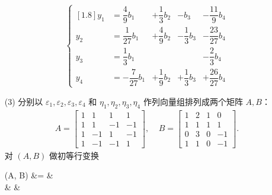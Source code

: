 \documentclass[11pt,a4paper,openany,oneside]{book}
\begin{document}
\begin{enumerate}
 $$ 
\left\{\begin{matrix}[1.8]
y_1 &=  \dfrac{4}{9}b_1 &+ \dfrac{1}{3}b_2 &- b_3               &-\dfrac{11}{9}b_4  \\
y_2 &=  \dfrac{1}{27}b_1 &+ \dfrac{4}{9}b_2  &- \dfrac{1}{3}b_3  &-\dfrac{23}{27}b_4 \\
y_3 &=  \dfrac{1}{3}b_1  &                    &                 &-\dfrac{2}{3}b_4 \\
y_4 &= -\dfrac{7}{27}b_1 &+ \dfrac{1}{9}b_2  &+ \dfrac{1}{3}b_3  &+\dfrac{26}{27}b_4 
\end{matrix}
\right.
 $$ 

\item[(3)] 分别以 $ \varepsilon_1, \varepsilon_2, \varepsilon_3, \varepsilon_4 $ 和 $ \eta_1, \eta_2, \eta_3, \eta_4 $ 作列向量组排列成两个矩阵 $A,B$：
\begin{gather*}
A = 
\begin{bmatrix}
1  &  1  &  1  &  1  \\
1  &  1  &  -1  &  -1  \\
1  &  -1  &  1  &  -1  \\
1  &  -1 &  -1  &  1  
\end{bmatrix},
\ \ \ \ \ 
B=
\begin{bmatrix}
1  &  2  &  1  &  0  \\
1  &  1  &  1  &  1  \\
0 &  3  &  0  &   -1  \\
1  &  1  &  0  &  -1  
\end{bmatrix}.
\end{gather*}
对 $(A,B)$ 做初等行变换
\begin{flalign*}
(A, B)
&= 
 &\\
&\Rightarrow 
{} &\\

\end{flalign*}
\end{enumerate}
\end{document}
